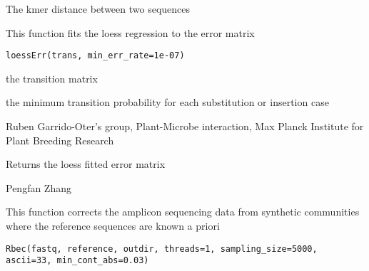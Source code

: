 \documentclass[a4paper]{book}
\begin{document}
%
\begin{Value}
The kmer distance between two sequences
\end{Value}
%
\begin{Description}\relax
This function fits the loess regression to the error matrix
\end{Description}
%
\begin{Usage}
\begin{verbatim}
loessErr(trans, min_err_rate=1e-07)
\end{verbatim}
\end{Usage}
%
\begin{Arguments}
\begin{ldescription}
\item[\code{trans}] the transition matrix

\item[\code{min\_err\_rate}] the minimum transition probability for each substitution or insertion case
\end{ldescription}
\end{Arguments}
%
\begin{Details}\relax
Ruben Garrido-Oter's group, Plant-Microbe interaction, Max Planck Institute for Plant Breeding Research
\end{Details}
%
\begin{Value}
Returns the loess fitted error matrix
\end{Value}
%
\begin{Author}\relax
Pengfan Zhang
\end{Author}
%
\begin{Description}\relax
This function corrects the amplicon sequencing data from synthetic communities where the reference sequences are known a priori
\end{Description}
%
\begin{Usage}
\begin{verbatim}
Rbec(fastq, reference, outdir, threads=1, sampling_size=5000, ascii=33, min_cont_abs=0.03)
\end{verbatim}
\end{Usage}
%
\end{document}
